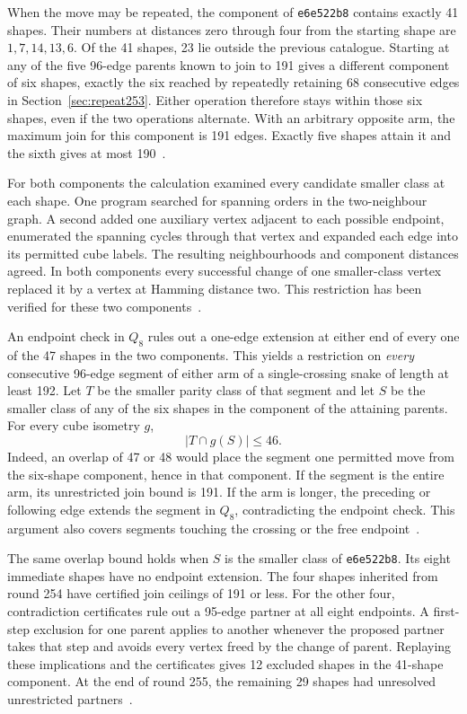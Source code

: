 \documentclass[11pt,a4paper]{article}
\theoremstyle{definition}
\theoremstyle{remark}
\newcommand{\Q}{Q}
\begin{document}
When the move may be repeated, the component of \texttt{e6e522b8}
contains exactly 41 shapes. Their numbers at distances zero through
four from the starting shape are $1,7,14,13,6$. Of the 41 shapes,
23 lie outside the previous catalogue. Starting at any of the five
96-edge parents known to join to 191 gives a different component of
six shapes, exactly the six reached by repeatedly retaining 68
consecutive edges in Section~\ref{sec:repeat253}. Either operation
therefore stays within those six shapes, even if the two operations
alternate. With an arbitrary opposite arm, the maximum join for
this component is 191 edges. Exactly five shapes attain it and the
sixth gives at most 190~\cite{root248,repeat253,exchange255}.

For both components the calculation examined every candidate
smaller class at each shape. One program searched for spanning
orders in the two-neighbour graph. A second added one auxiliary
vertex adjacent to each possible endpoint, enumerated the spanning
cycles through that vertex and expanded each edge into its permitted
cube labels. The resulting neighbourhoods and component distances
agreed. In both components every successful change of one smaller-class
vertex replaced it by a vertex at Hamming distance two. This restriction
has been verified for these two components~\cite{exchange255}.

An endpoint check in $\Q_8$ rules out a one-edge extension at
either end of every one of the 47 shapes in the two components.
This yields a restriction on \emph{every} consecutive 96-edge
segment of either arm of a single-crossing snake of length at least
192. Let $T$ be the smaller parity class of that segment and let
$S$ be the smaller class of any of the six shapes in the component
of the attaining parents. For every cube isometry $g$,
\[
  |T\cap g(S)|\le 46.
\]
Indeed, an overlap of 47 or 48 would place the segment one permitted
move from the six-shape component, hence in that component. If the
segment is the entire arm, its unrestricted join bound is 191.
If the arm is longer, the preceding or following edge extends the
segment in $\Q_8$, contradicting the endpoint check. This argument
also covers segments touching the crossing or the free
endpoint~\cite{repeat253,exchange255}.

The same overlap bound holds when $S$ is the smaller class of
\texttt{e6e522b8}. Its eight immediate shapes have no endpoint
extension. The four shapes inherited from round 254 have certified
join ceilings of 191 or less. For the other four, contradiction
certificates rule out a 95-edge partner at all eight endpoints.
A first-step exclusion for one parent applies to another whenever
the proposed partner takes that step and avoids every vertex freed
by the change of parent. Replaying these implications and the
certificates gives 12 excluded shapes in the 41-shape component.
At the end of round 255, the remaining 29 shapes had unresolved
unrestricted partners~\cite{exchange255}.
\end{document}
